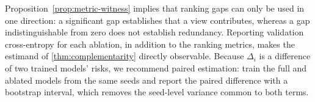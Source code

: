 \begin{remark}
\label{rem:protocol}
Proposition~\ref{prop:metric-witness} implies that ranking gaps can only be used in one direction: a significant gap establishes that a view contributes, whereas a gap indistinguishable from zero does not establish redundancy. Reporting validation cross-entropy for each ablation, in addition to the ranking metrics, makes the estimand of \cref{thm:complementarity} directly observable. Because $\Delta_i$ is a difference of two trained models' risks, we recommend paired estimation: train the full and ablated models from the same seeds and report the paired difference with a bootstrap interval, which removes the seed-level variance common to both terms.
\end{remark}